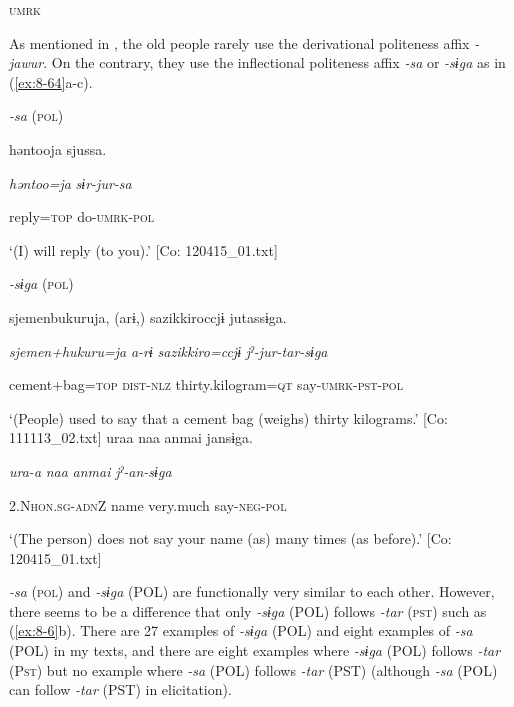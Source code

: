           \textsc{umrk}

As mentioned in , the old people rarely use the derivational politeness affix \textit{{}-jawur}. On the contrary, they use the inflectional politeness affix \textit{{}-sa} or \textit{{}-sɨga} as in (\ref{ex:8-64}a-c).

\ea\label{ex:8-64}
  \textit{{}-sa} (\textsc{pol})


    {\TM}
\glll  həntooja  sjussa.

      \textit{həntoo=ja}  \textit{sɨr-jur-sa}

      reply=\textsc{top}  do-\textsc{umrk}-\textsc{pol}

\glt ‘(I) will reply (to you).’ [Co: 120415\_01.txt]
\z

  \textit{{}-sɨga} (\textsc{pol})

\ex {\TM}
\glll  sjemenbukuruja,  (arɨ,)  sazikkiroccjɨ  jutassɨga.

      \textit{sjemen+hukuru=ja}  \textit{a-rɨ}  \textit{sazikkiro=ccjɨ}  \textit{jˀ-jur-tar-sɨga}

      cement+bag=\textsc{top}  \textsc{dist}-\textsc{nlz}  thirty.kilogram=\textsc{qt}  say-\textsc{umrk}-\textsc{pst}-\textsc{pol}

\glt ‘(People) used to say that a cement bag (weighs) thirty kilograms.’ [Co: 111113\_02.txt]
\ex {\TM}
\glll  uraa  naa  anmai  jansɨga.

      \textit{ura-a}  \textit{naa}  \textit{anmai}  \textit{jˀ-an-sɨga}

      2.N\textsc{hon}.\textsc{sg}-\textsc{adn}Z  name  very.much  say-\textsc{neg}-\textsc{pol}

\glt ‘(The person) does not say your name (as) many times (as before).’ [Co: 120415\_01.txt]
\z

\textit{{}-sa} (\textsc{pol}) and \textit{{}-sɨga} (POL) are functionally very similar to each other. However, there seems to be a difference that only \textit{{}-sɨga} (POL) follows \textit{{}-tar} (\textsc{pst}) such as (\ref{ex:8-6}b). There are 27 examples of \textit{{}-sɨga} (POL) and eight examples of \textit{{}-sa} (POL) in my texts, and there are eight examples where \textit{{}-sɨga} (POL) follows \textit{{}-tar} (P\textsc{st}) but no example where \textit{{}-sa} (POL) follows \textit{-tar} (PST) (although \textit{-sa} (POL) can follow \textit{{}-tar} (PST) in elicitation).

